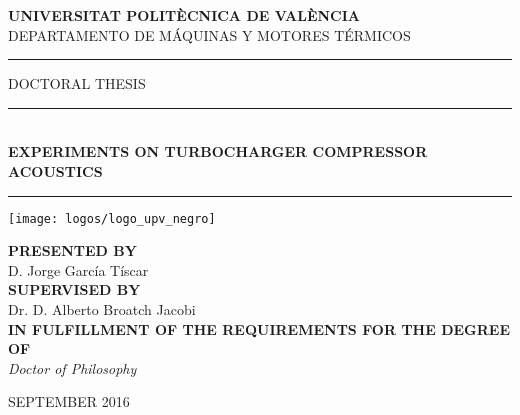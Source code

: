 \documentclass[final,twoside,11pt]{book}
\makeatletter
\numberwithin{equation}{section}
\numberwithin{figure}{chapter}
\numberwithin{table}{chapter}
\def\cleardoublepage{\clearpage\if@twoside \ifodd\c@page\else
  \hbox{}
  \thispagestyle{empty}
  \newpage
  \if@twocolumn\hbox{}\newpage\fi\fi\fi}
\makeatother
\begin{document}

%

\enlargethispage{5cm}
\begin{center}
\Large\cabin\textbf{UNIVERSITAT POLITÈCNICA DE VALÈNCIA}\\[1mm]
\large DEPARTAMENTO DE MÁQUINAS Y MOTORES TÉRMICOS\\
\vspace{1cm}

\rule[0.3\baselineskip]{3.8cm}{0.4pt}
\noindent\cabin\large{\hspace{2mm}DOCTORAL THESIS\hspace{2mm}}
\rule[0.3\baselineskip]{3.8cm}{0.4pt}
\vspace{2mm}\\
\huge\textbf{EXPERIMENTS ON TURBOCHARGER COMPRESSOR ACOUSTICS}\\
\vspace{-2.5mm}
\rule{\textwidth}{0.4pt}
\vspace{1cm}

\texttt{[image: logos/logo\_upv\_negro]}

\vspace{1.3cm}

{\normalsize\bfseries\cabincondensed PRESENTED BY}\\
\rm\Large D. Jorge García Tíscar\\[4mm]
{\normalsize\bfseries\cabincondensed SUPERVISED BY}\\
\rm\Large Dr. D. Alberto Broatch Jacobi\\[13mm]

{\normalsize\bfseries\cabincondensed IN FULFILLMENT OF THE REQUIREMENTS FOR THE DEGREE OF}\\[2mm]
\it\Large Doctor of Philosophy

\vspace{2cm}

\footnotesize\rm\cabin SEPTEMBER 2016
\end{center}
\cleardoublepage


\titleformat{\chapter}[hang]{}{}{0mm}{\large\bfseries\sffamily\Huge}
\end{document}
